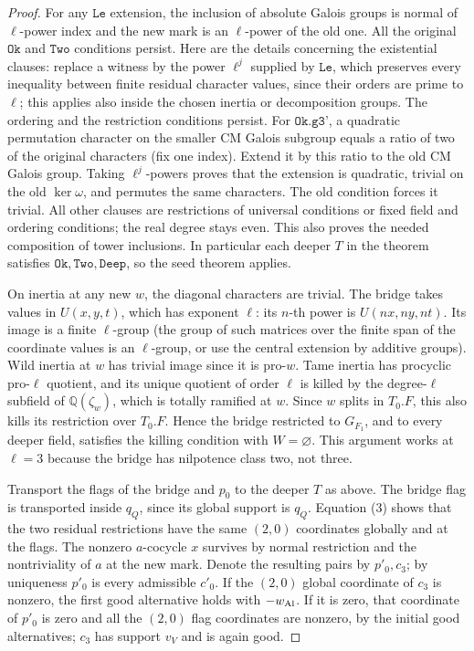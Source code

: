 \begin{proof}
For any \(\texttt{Le}\) extension, the inclusion of
absolute Galois groups is normal of \(\ell\)-power index
and the new mark is an \(\ell\)-power of the old one.
All the original \(\texttt{Ok}\) and \(\texttt{Two}\)
conditions persist. Here are the details concerning
the existential clauses: replace a witness by the
power \(\ell^j\) supplied by \(\texttt{Le}\), which
preserves every inequality between finite residual
character values, since their orders are prime to
\(\ell\); this applies also inside the chosen inertia
or decomposition groups. The ordering and the
restriction conditions persist. For \(\texttt{Ok.g3'}\),
a quadratic permutation character on the smaller
CM Galois subgroup equals a ratio of two of the
original characters (fix one index). Extend it by
this ratio to the old CM Galois group. Taking
\(\ell^j\)-powers proves that the extension is quadratic,
trivial on the old \(\ker\omega\), and permutes the
same characters. The old condition forces it trivial.
All other clauses are restrictions of universal
conditions or fixed field and ordering conditions;
the real degree stays even. This also proves the
needed composition of tower inclusions. In particular
each deeper \(T\) in the theorem satisfies
\(\texttt{Ok},\texttt{Two},\texttt{Deep}\), so the seed
theorem applies.

On inertia at any new \(w\), the diagonal characters
are trivial. The bridge takes values in \(U(x,y,t)\),
which has exponent \(\ell\): its \(n\)-th power is
\(U(nx,ny,nt)\). Its image is a finite \(\ell\)-group
(the group of such matrices over the finite span of
the coordinate values is an \(\ell\)-group, or use
the central extension by additive groups).
Wild inertia at \(w\) has trivial image since it is
pro-\(w\). Tame inertia has procyclic pro-\(\ell\)
quotient, and its unique quotient of order \(\ell\)
is killed by the degree-\(\ell\) subfield of
\(\mathbb Q(\zeta_w)\), which is totally ramified
at \(w\). Since \(w\) splits in \(T_0.F\), this also
kills its restriction over \(T_0.F\). Hence the bridge
restricted to \(G_{F_1}\), and to every deeper field,
satisfies the killing condition with \(W=\varnothing\).
This argument works at \(\ell=3\) because the bridge
has nilpotence class two, not three.

Transport the flags of the bridge and \(p_0\) to the
deeper \(T\) as above. The bridge flag is transported
inside \(q_Q\), since its global support is \(q_Q\).
Equation (3) shows that the two residual restrictions
have the same \((2,0)\) coordinates globally and at
the flags. The nonzero \(a\)-cocycle \(x\) survives by
normal restriction and the nontriviality of \(a\) at
the new mark. Denote the resulting pairs by \(p'_0,c_3\);
by uniqueness \(p'_0\) is every admissible \(c'_0\).
If the \((2,0)\) global coordinate of \(c_3\) is nonzero,
the first good alternative holds with \(-w_{\rm Al}\).
If it is zero, that coordinate of \(p'_0\) is zero
and all the \((2,0)\) flag coordinates are nonzero,
by the initial good alternatives; \(c_3\) has support
\(v_V\) and is again good.


\end{proof}
